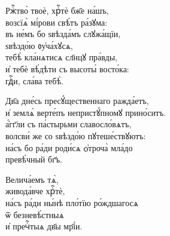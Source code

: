 \documentclass{article}
\begin{document}
%
%
Ржⷭ҇тво̀ твоѐ, хрⷭ҇тѐ бж҃е на́шъ,\\
возсїѧ̀ мі́рови свѣ́тъ ра́зꙋма:\\
въ не́мъ бо ѕвѣзда́мъ слꙋжа́щїи,\\
ѕвѣздо́ю ᲂу҆ча́хꙋсѧ,\\
тебѣ̀ кла́нѧтисѧ сл҃нцꙋ пра́вды,\\
и҆ тебѐ вѣ́дѣти съ высоты̀ восто́ка:\\
гдⷭ҇и, сла́ва тебѣ̀.

%
Дв҃а дне́сь пресꙋ́щественнаго ражда́етъ,\\
и҆ землѧ̀ верте́пъ непристꙋ́пномꙋ прино́ситъ.\\
а҆́гг҃ли съ па́стырьми славосло́вѧтъ,\\
волсви́ же со ѕвѣздо́ю пꙋтеше́ствꙋютъ:\\
на́съ бо ра́ди роди́сѧ ѻ҆троча̀ мла́до\\
превѣ́чный бг҃ъ.

%
Велича́емъ тѧ̀, \\
живода́вче хрⷭ҇тѐ, \\
на́съ ра́ди ны́нѣ пло́тїю ро́ждшагосѧ\\
ѿ безневѣ́стныѧ\\
и҆ пречⷭ҇тыѧ дв҃ы мр҃і́и.
\end{document}
